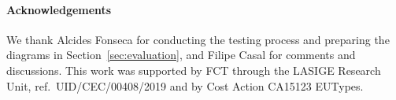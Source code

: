 \documentclass[orivec,runningheads]{llncs}
\begin{document}








% 

\newpage


\paragraph{Acknowledgements}
We thank Alcides Fonseca for conducting the testing process and
preparing the diagrams in Section~\ref{sec:evaluation}, and Filipe
Casal for comments and discussions.
%
This work was supported by FCT through the LASIGE Research Unit, ref.\
UID/CEC/00408/2019 and by Cost Action CA15123 EUTypes.




%
%
%
%
%
\end{document}
